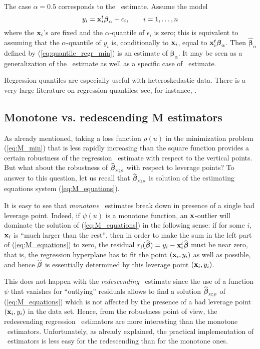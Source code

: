 The case $\alpha=0.5$ corresponds to the ~estimate. Assume the model
\[
    y_i = \mathbf x_i^t \boldsymbol\beta_{\alpha} + \epsilon_i,
    \qquad i = 1, \dots, n
\]
where the $\mathbf x_i$'s are fixed and the $\alpha$-quantile of
$\epsilon_i$ is zero; this is equivalent to assuming that the
$\alpha$-quantile of $y_i$ is, conditionally to $\mathbf x_i$, equal to
$\mathbf x_i^t\boldsymbol\beta_{\alpha}$. Then $\widehat
{\boldsymbol\beta}_{\alpha}$ defined by (\ref{eq:quantile_regr_min}) is an
estimate of $\boldsymbol\beta_{\alpha}$. It may be seen as a generalization of
the ~estimate as well as a specific case of ~estimate.

Regression quantiles are especially useful with heteroskedastic data. There is
a very large literature on regression quantiles; see, for instance,
\citet{Koenker:2005}.

\subsection{Monotone vs. redescending M estimators}

As already mentioned, taking a loss function $\rho(u)$ in the minimization
problem (\ref{eq:M_min}) that is less rapidly increasing than the square
function provides a certain robustness of the regression ~estimate with
respect to the vertical points. But what about the robustness of
$\sthat{\boldsymbol\beta}_{\stsc{M};\rho}$ with respect to leverage points? To
answer to this question, let us recall that
$\sthat{\boldsymbol\beta}_{\stsc{M};\rho}$ is solution of the estimating
equations system (\ref{eq:M_equations}).

It is easy to see that \emph{monotone} ~estimates break down in
presence of a single bad leverage point. Indeed, if $\psi(u)$ is a monotone
function, an $\mathbf x$-outlier will dominate the solution of
(\ref{eq:M_equations}) in the following sense: if for some $i$, $\mathbf x_i$
is “much larger than the rest”, then in order to make the sum in the left part
of (\ref{eq:M_equations}) to zero, the residual
$r_i(\widehat{\boldsymbol\beta}) = y_i -
\mathbf x_i^t\widehat{\boldsymbol\beta}$ must be near zero, that is, the
regression hyperplane has to fit the point $(\mathbf x_i, y_i)$ as well as
possible, and hence $\widehat{\boldsymbol\beta}$ is essentially determined by
this leverage point $(\mathbf x_i, y_i)$.

This does not happen with the \emph{redescending} ~estimate since the
use of a function $\psi$ that vanishes for “outlying” residuals allows to find
a solution $\widehat{\boldsymbol\beta}_{\stsc{M};\rho}$ of
(\ref{eq:M_equations}) which is not affected by the presence of a bad leverage
point $(\mathbf x_i, y_i)$ in the data set. Hence, from the robustness
point of view, the redescending regression ~estimators are more interesting
than the monotone ~estimators. Unfortunately, as already explained, the
practical implementation of ~estimators is less easy for the
redescending than for the monotone ones.


